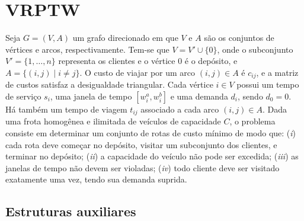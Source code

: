  
 

\section{VRPTW}
Seja $G = (V,A)$ um grafo direcionado em que $V$ e $A$ são os conjuntos de vértices e arcos, respectivamente. Tem-se que $V = V' \cup \{0\}$, onde o subconjunto $V' = \{1, \dots, n\}$ representa os clientes e o vértice $0$ é o depósito, e $A = \{ (i,j) \mid i \neq j \}$. O custo de viajar por um arco $(i,j)\in A$ é $c_{ij}$, e a matriz de custos satisfaz a desigualdade triangular. Cada vértice $i \in V$ possui um tempo de serviço $s_i$, uma janela de tempo $[w_i^a, w_i^b]$ e uma demanda $d_i$, sendo $d_0 = 0$. Há também um tempo de viagem $t_{ij}$ associado a cada arco $(i,j) \in A$. Dada uma frota homogênea e ilimitada de veículos de capacidade $C$, o problema consiste em determinar um conjunto de rotas de custo mínimo de modo que: (\textit{i}) cada rota deve começar no depósito, visitar um subconjunto dos clientes, e terminar no depósito; (\textit{ii}) a capacidade do veículo não pode ser excedida; (\textit{iii}) as janelas de tempo não devem ser violadas; (\textit{iv}) todo cliente deve ser visitado exatamente uma vez, tendo sua demanda suprida.

\subsection{Estruturas auxiliares}
